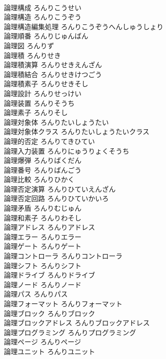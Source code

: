 \documentclass[8pt]{extreport}
\begin{document}
\begin{CJK}{UTF8}{min}
\\	論理構成	ろんりこうせい	
\\	論理構造	ろんりこうぞう	
\\	論理構造編集処理	ろんりこうぞうへんしゅうしょり	
\\	論理順番	ろんりじゅんばん	
\\	論理図	ろんりず	
\\	論理積	ろんりせき	
\\	論理積演算	ろんりせきえんざん	
\\	論理積結合	ろんりせきけつごう	
\\	論理積素子	ろんりせきそし	
\\	論理設計	ろんりせっけい	
\\	論理装置	ろんりそうち	
\\	論理素子	ろんりそし	
\\	論理対象体	ろんりたいしょうたい	
\\	論理対象体クラス	ろんりたいしょうたいクラス	
\\	論理的否定	ろんりてきひてい	
\\	論理入力装置	ろんりにゅうりょくそうち	
\\	論理爆弾	ろんりばくだん	
\\	論理番号	ろんりばんごう	
\\	論理比較	ろんりひかく	
\\	論理否定演算	ろんりひていえんざん	
\\	論理否定回路	ろんりひていかいろ	
\\	論理矛盾	ろんりむじゅん	
\\	論理和素子	ろんりわそし	
\\	論理アドレス	ろんりアドレス	
\\	論理エラー	ろんりエラー	
\\	論理ゲート	ろんりゲート	
\\	論理コントローラ	ろんりコントローラ	
\\	論理シフト	ろんりシフト	
\\	論理ドライブ	ろんりドライブ	
\\	論理ノード	ろんりノード	
\\	論理パス	ろんりパス	
\\	論理フォーマット	ろんりフォーマット	
\\	論理ブロック	ろんりブロック	
\\	論理ブロックアドレス	ろんりブロックアドレス	
\\	論理プログラミング	ろんりプログラミング	
\\	論理ページ	ろんりページ	
\\	論理ユニット	ろんりユニット	

\end{CJK}
\end{document}

